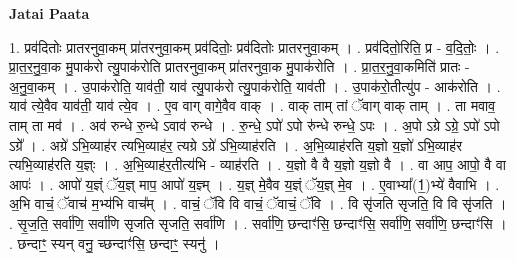 \documentclass[17pt]{extarticle}
\begin{document}
\textbf{Jatai Paata} \newline

1. प्रव॑दितोः प्रातरनुवा॒कम् प्रा॑तरनुवा॒कम् प्रव॑दितोः॒ प्रव॑दितोः प्रातरनुवा॒कम् । . प्रव॑दितो॒रिति॒ प्र - व॒दि॒तोः॒ । . प्रा॒त॒र॒नु॒वा॒क मु॒पाक॑रो त्यु॒पाक॑रोति प्रातरनुवा॒कम् प्रा॑तरनुवा॒क मु॒पाक॑रोति । . प्रा॒त॒र॒नु॒वा॒कमिति॑ प्रातः - अ॒नु॒वा॒कम् । . उ॒पाक॑रोति॒ याव॑ती॒ याव॑ त्यु॒पाक॑रो त्यु॒पाक॑रोति॒ याव॑ती । . उ॒पाक॑रो॒तीत्यु॑प - आक॑रोति । . याव॑ त्ये॒वैव याव॑ती॒ याव॑ त्ये॒व । . ए॒व वाग् वागे॒वैव वाक् । . वाक् ताम् तां ॅवाग् वाक् ताम् । . ता मवाव॒ ताम् ता मव॑ । . अव॑ रुन्धे रु॒न्धे ऽवाव॑ रुन्धे । . रु॒न्धे॒ ऽपो॑ ऽपो रु॑न्धे रुन्धे॒ ऽपः । . अ॒पो ऽग्रे ऽग्रे॒ ऽपो॑ ऽपो ऽग्रे᳚ । . अग्रे॑ ऽभि॒व्याह॑र त्यभि॒व्याह॑र॒ त्यग्रे ऽग्रे॑ ऽभि॒व्याह॑रति । . अ॒भि॒व्याह॑रति य॒ज्ञो य॒ज्ञो॑ ऽभि॒व्याह॑र त्यभि॒व्याह॑रति य॒ज्ञ्ः । . अ॒भि॒व्याह॑र॒तीत्य॑भि - व्याह॑रति । . य॒ज्ञो वै वै य॒ज्ञो य॒ज्ञो वै । . वा आप॒ आपो॒ वै वा आपः॑ । . आपो॑ य॒ज्ञ्ं ॅय॒ज्ञ् माप॒ आपो॑ य॒ज्ञ्म् । . य॒ज्ञ् मे॒वैव य॒ज्ञ्ं ॅय॒ज्ञ् मे॒व । . ए॒वाभ्या᳚(1॒)भ्ये॑ वैवाभि । . अ॒भि वाचं॒ ॅवाच॑ म॒भ्य॑भि वाच᳚म् । . वाचं॒ ॅवि वि वाचं॒ ॅवाचं॒ ॅवि । . वि सृ॑जति सृजति॒ वि वि सृ॑जति । . सृ॒ज॒ति॒ सर्वा॑णि॒ सर्वा॑णि सृजति सृजति॒ सर्वा॑णि । . सर्वा॑णि॒ छन्दाꣳ॑सि॒ छन्दाꣳ॑सि॒ सर्वा॑णि॒ सर्वा॑णि॒ छन्दाꣳ॑सि । . छन्दाꣳ॒॒ स्यन् वनु॒ च्छन्दाꣳ॑सि॒ छन्दाꣳ॒॒ स्यनु॑ । \newline
\end{document}
